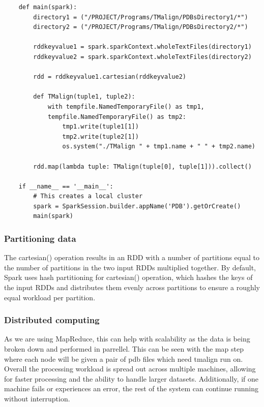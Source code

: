 \documentclass[]{final_report}
\begin{document}
\begin{lstlisting}
    def main(spark):
        directory1 = ("/PROJECT/Programs/TMalign/PDBsDirectory1/*")
        directory2 = ("/PROJECT/Programs/TMalign/PDBsDirectory2/*")

        rddkeyvalue1 = spark.sparkContext.wholeTextFiles(directory1)
        rddkeyvalue2 = spark.sparkContext.wholeTextFiles(directory2)

        rdd = rddkeyvalue1.cartesian(rddkeyvalue2)

        def TMalign(tuple1, tuple2):
            with tempfile.NamedTemporaryFile() as tmp1, 
            tempfile.NamedTemporaryFile() as tmp2:
                tmp1.write(tuple1[1])
                tmp2.write(tuple2[1])
                os.system("./TMalign " + tmp1.name + " " + tmp2.name)

        rdd.map(lambda tuple: TMalign(tuple[0], tuple[1])).collect()
            
    if __name__ == '__main__':
        # This creates a local cluster
        spark = SparkSession.builder.appName('PDB').getOrCreate()
        main(spark)
\end{lstlisting}

\clearpage

\subsubsection{Partitioning data}
The cartesian() operation results in an RDD with a number of partitions equal to the number of partitions in the two input RDDs multiplied together. By default, Spark uses hash partitioning for cartesian() operation, which hashes the keys of the input RDDs and distributes them evenly across partitions to ensure a roughly equal workload per partition.

\subsubsection{Distributed computing}
As we are using MapReduce, this can help with scalability as the data is being broken down and performed in parrellel. This can be seen with the map step where each node will be given a pair of pdb files which need tmalign run on. Overall the processing workload is spread out across multiple machines, allowing for faster processing and the ability to handle larger datasets. Additionally, if one machine fails or experiences an error, the rest of the system can continue running without interruption.
\end{document}
